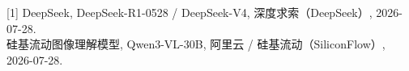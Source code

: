 [1] DeepSeek, DeepSeek-R1-0528 / DeepSeek-V4, 深度求索（DeepSeek）, 2026-07-28.\\
[2] 硅基流动图像理解模型, Qwen3-VL-30B, 阿里云 / 硅基流动（SiliconFlow）, 2026-07-28.\\
